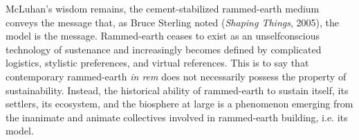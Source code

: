 McLuhan's wisdom remains, the cement-stabilized rammed-earth medium conveys the message that, as Bruce Sterling noted (\textit{Shaping Things}, 2005), the model is the message. Rammed-earth ceases to exist as an unselfconscious technology of sustenance and increasingly becomes defined by complicated logistics, stylistic preferences, and virtual references. This is to say that contemporary rammed-earth \textit{in rem} does not necessarily possess the property of sustainability. Instead, the historical ability of rammed-earth to sustain itself, its settlers, its ecosystem, and the biosphere at large is a phenomenon emerging from the inanimate and animate collectives involved in rammed-earth building, i.e. its model.
